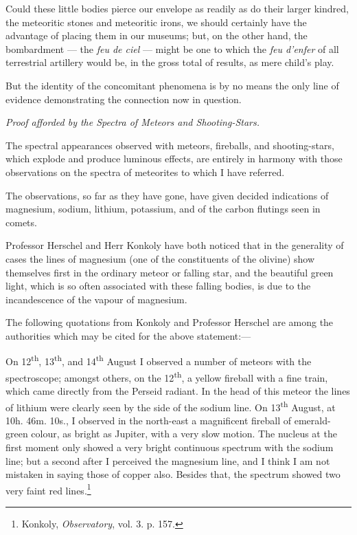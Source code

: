 \documentclass[a4paper, 12pt, oneside, polutonikogreek, english]{article}
\begin{document}
Could these little bodies pierce our envelope as readily as do their larger kindred, the meteoritic stones and meteoritic irons, we should certainly have the advantage of placing them in our museums; but, on the other hand, the bombardment --- the \emph{feu de ciel} --- might be one to which the \emph{feu d'enfer} of all terrestrial artillery would be, in the gross total of results, as mere child's play.

But the identity of the concomitant phenomena is by no means the only line of evidence demonstrating the connection now in question.

\emph{Proof afforded by the Spectra of Meteors and Shooting-Stars.}

The spectral appearances observed with meteors, fireballs, and shooting-stars, which explode and produce luminous effects, are entirely in harmony with those observations on the spectra of meteorites to which I have referred.

The observations, so far as they have gone, have given decided indications of magnesium, sodium, lithium, potassium, and of the carbon flutings seen in comets.

Professor Herschel and Herr Konkoly have both noticed that in the generality of cases the lines of magnesium (one of the constituents of the olivine) show themselves first in the ordinary meteor or falling star, and the beautiful green light, which is so often associated with these falling bodies, is due to the incandescence of the vapour of magnesium.

The following quotations from Konkoly and Professor Herschel are among the authorities which may be cited for the above statement:---

On 12\textsuperscript{th}, 13\textsuperscript{th}, and 14\textsuperscript{th} August I observed a number of meteors with the spectroscope; amongst others, on the 12\textsuperscript{th}, a yellow fireball with a fine train, which came directly from the Perseid radiant. In the head of this meteor the lines of lithium were clearly seen by the side of the sodium line. On 13\textsuperscript{th} August, at 10h. 46m. 10s., I observed in the north-east a magnificent fireball of emerald-green colour, as bright as Jupiter, with a very slow motion. The nucleus at the first moment only showed a very bright continuous spectrum with the sodium line; but a second after I perceived the magnesium line, and I think I am not mistaken in saying those of copper also. Besides that, the spectrum showed two very faint red lines.\footnote{Konkoly, \emph{Observatory}, vol. 3. p. 157.}
\end{document}
